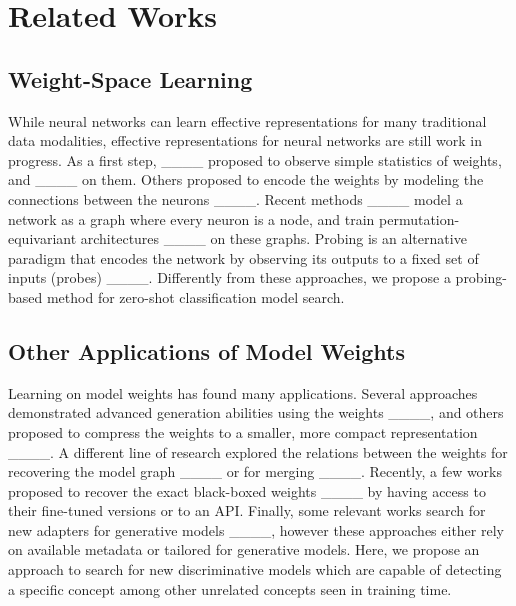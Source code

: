 \section{Related Works}
\label{sec:related_works}

\subsection{Weight-Space Learning}

While neural networks can learn effective representations for many traditional data modalities, effective representations for neural networks are still work in progress. As a first step, ____ proposed to observe simple statistics of weights, and  ____ on them. Others proposed to encode the weights by modeling the connections between the neurons ____. Recent methods ____ model a network as a graph where every neuron is a node, and train permutation-equivariant architectures ____ on these graphs.
Probing is an alternative paradigm that encodes the network by observing its outputs to a fixed set of inputs (probes)  ____. Differently from these approaches, we propose a probing-based method for zero-shot classification model search.

\subsection{Other Applications of Model Weights}

Learning on model weights has found many applications. Several approaches demonstrated advanced generation abilities using the weights ____, and others proposed to compress the weights to a smaller, more compact representation ____. A different line of research explored the relations between the weights for recovering the model graph ____ or for merging ____. Recently, a few works proposed to recover the exact black-boxed weights ____ by having access to their fine-tuned versions or to an API. Finally, some relevant works search for new adapters for generative models ____, however these approaches either rely on available metadata or tailored for generative models. Here, we propose an approach to search for new discriminative models which are capable of detecting a specific concept among other unrelated concepts seen in training time.